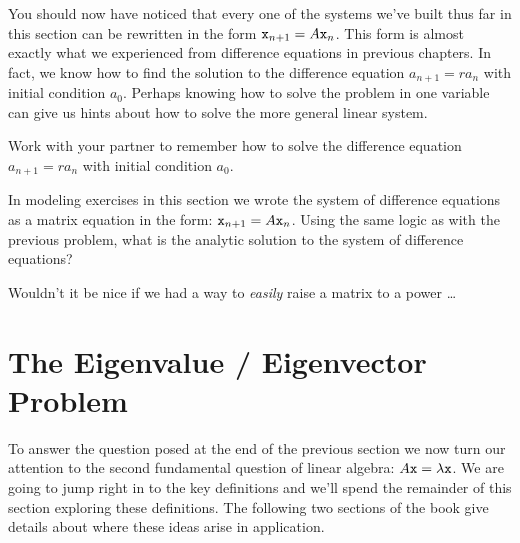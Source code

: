 You should now have noticed that every one of the systems we've built thus far in this
section can be rewritten in the form $\texttt{x}_{n+1} = A \texttt{x}_n$.   This form is almost exactly
what we experienced from difference equations in previous chapters.  In fact, we know how
to find the solution to the difference equation $a_{n+1} = r a_n$ with initial condition
$a_0$.  Perhaps knowing how to solve the problem in one variable can give us hints about
how to solve the more general linear system.
\begin{problem}
    Work with your partner to remember how to solve the difference equation $a_{n+1} = r
    a_n$ with initial condition $a_0$. 
\end{problem}
\begin{problem}
    In modeling exercises in this section we wrote the system of difference equations as
    a matrix equation in the form: $\texttt{x}_{n+1} = A \texttt{x}_n$.  Using the same logic as
    with the previous problem, what is the analytic solution to the system of
    difference equations?
\end{problem}


Wouldn't it be nice if we had a way to {\it easily} raise a matrix to a power \dots
        


\newpage\section{The Eigenvalue / Eigenvector Problem}
To answer the question posed at the end of the previous section we now turn our attention to the second fundamental question of linear algebra: $A \texttt{x} =
\lambda \texttt{x}$.  We are going to jump right in to the key definitions and we'll spend the
remainder of this section exploring these definitions.  The following two sections of the
book give details about where these ideas arise in application.

